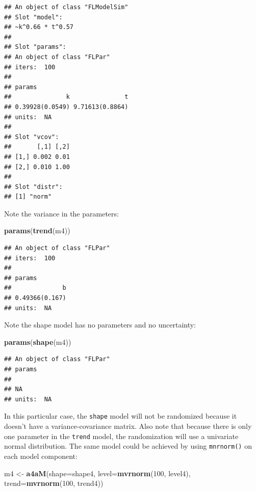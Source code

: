 \documentclass[
]{book}
\newenvironment{Shaded}{\begin{snugshade}}{\end{snugshade}}
\newcommand{\AttributeTok}[1]{\textcolor[rgb]{0.13,0.29,0.53}{#1}}
\newcommand{\DecValTok}[1]{\textcolor[rgb]{0.00,0.00,0.81}{#1}}
\newcommand{\FunctionTok}[1]{\textcolor[rgb]{0.13,0.29,0.53}{\textbf{#1}}}
\newcommand{\NormalTok}[1]{#1}
\newcommand{\OtherTok}[1]{\textcolor[rgb]{0.56,0.35,0.01}{#1}}
\begin{document}
\begin{verbatim}
## An object of class "FLModelSim"
## Slot "model":
## ~k^0.66 * t^0.57
## 
## Slot "params":
## An object of class "FLPar"
## iters:  100 
## 
## params
##               k               t 
## 0.39928(0.0549) 9.71613(0.8864) 
## units:  NA 
## 
## Slot "vcov":
##       [,1] [,2]
## [1,] 0.002 0.01
## [2,] 0.010 1.00
## 
## Slot "distr":
## [1] "norm"
\end{verbatim}

Note the variance in the parameters:

\begin{Shaded}
\begin{Highlighting}[]
\FunctionTok{params}\NormalTok{(}\FunctionTok{trend}\NormalTok{(m4))}
\end{Highlighting}
\end{Shaded}

\begin{verbatim}
## An object of class "FLPar"
## iters:  100 
## 
## params
##              b 
## 0.49366(0.167) 
## units:  NA
\end{verbatim}

Note the shape model has no parameters and no uncertainty:

\begin{Shaded}
\begin{Highlighting}[]
\FunctionTok{params}\NormalTok{(}\FunctionTok{shape}\NormalTok{(m4))}
\end{Highlighting}
\end{Shaded}

\begin{verbatim}
## An object of class "FLPar"
## params
##    
## NA 
## units:  NA
\end{verbatim}

In this particular case, the \texttt{shape} model will not be randomized because it doesn't have a variance-covariance matrix. Also note that because there is only one parameter in the \texttt{trend} model, the randomization will use a univariate normal distribution. The same model could be achieved by using \texttt{mnrnorm()} on each model component:

\begin{Shaded}
\begin{Highlighting}[]
\NormalTok{m4 }\OtherTok{\textless{}{-}} \FunctionTok{a4aM}\NormalTok{(}\AttributeTok{shape=}\NormalTok{shape4,}
    \AttributeTok{level=}\FunctionTok{mvrnorm}\NormalTok{(}\DecValTok{100}\NormalTok{, level4),}
    \AttributeTok{trend=}\FunctionTok{mvrnorm}\NormalTok{(}\DecValTok{100}\NormalTok{, trend4))}
\end{Highlighting}
\end{Shaded}
\end{document}
